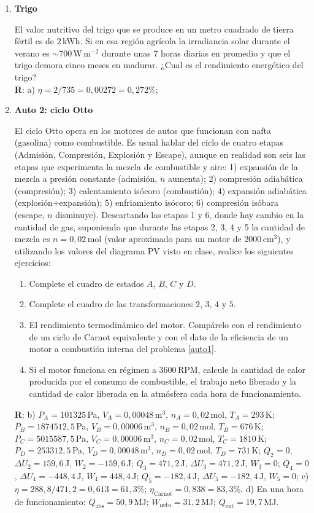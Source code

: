 \documentclass[a4paper,12pt]{article}
\begin{document}
\begin{enumerate}
	\item {\bf{Trigo}}
		
		El valor nutritivo del trigo que se produce en un metro cuadrado de
		tierra fértil es de $2$\,kWh. Si en esa región agrícola la irradiancia solar
		durante el verano es $\sim 700$\,W\,m$^{-2}$ durante unas 7 horas
		diarias en promedio y que el trigo demora cinco meses en madurar.  
		¿Cual es el rendimiento energético del trigo? 
		\\{\bf{R}}: a) $\eta=2/735=0,00272 = 0,272\%$;

	\item {\bf{Auto 2: ciclo Otto}}
		
		El ciclo Otto opera en los motores de autos que funcionan con nafta
		(gasolina) como combustible. Es usual hablar del ciclo de cuatro etapas
		(Admisión, Compresión, Explosión y Escape), aunque en realidad son seis
		las etapas que experimenta la mezcla de combustible y aire: 1)
		expansión de la mezcla a presión constante (admisión, $n$ aumenta); 2)
		compresión adiabática (compresión); 3) calentamiento isócoro
		(combustión); 4) expansión adiabática (explosión+expansión); 5)
		enfriamiento isócoro; 6) compresión isóbara (escape, $n$ disminuye).
		Descartando las etapas 1 y 6, donde hay cambio en la cantidad de gas,
		suponiendo que durante las etapas 2, 3, 4 y 5 la cantidad de mezcla es
		$n=0,02$\,mol (valor aproximado para un motor de $2000$\,cm$^3$), y
		utilizando los valores del diagrama PV visto en clase, realice los
		siguientes ejercicios:
		\begin{enumerate}
			\item Complete el cuadro de estados $A$, $B$, $C$ y $D$. 
			\item Complete el cuadro de las transformaciones $2$, $3$, $4$ y
				$5$.  
			\item El rendimiento termodinámico del motor. Compárelo con el
				rendimiento de un ciclo de Carnot equivalente y con el dato de
				la eficiencia de un motor a combustión interna del problema
				\ref{auto1}.
			\item Si el motor funciona en régimen a $3600$\,RPM, calcule la
				cantidad de calor producida por el consumo de combustible, el
				trabajo neto liberado y la cantidad de calor liberada en la
				atmósfera cada hora de funcionamiento.		
		\end{enumerate}
		{\bf{R}}: 
		b)
		$P_A=101325$\,Pa, $V_A=0,00048$\,m$^3$, $n_A=0,02$\,mol, $T_A=293$\,K; 
		$P_B=1874512,5$\,Pa, $V_B=0,00006$\,m$^3$, $n_B=0,02$\,mol, $T_B=676$\,K; 
		$P_C=5015587,5$\,Pa, $V_C=0,00006$\,m$^3$, $n_C=0,02$\,mol, $T_C=1810$\,K; 
		$P_D=253312,5$\,Pa, $V_D=0,00048$\,m$^3$, $n_D=0,02$\,mol, $T_D=731$\,K;
		$Q_2=0$, $\Delta U_2=159,6$\,J, $W_2=-159,6$\,J;
		$Q_3=471,2$\,J, $\Delta U_3=471,2$\,J, $W_3=0$;
		$Q_4=0$, $\Delta U_4=-448,4$\,J, $W_4=448,4$\,J;
		$Q_5=-182,4$\,J, $\Delta U_5=-182,4$\,J, $W_5=0$;
		c)
		$\eta=288,8/471,2 = 0,613 = 61,3\%$; $\eta_{\mathrm{Carnot}} = 0,838 = 83,3\%$.
		d) En una hora de funcionamiento: $Q_{\mathrm{abs}}=50,9$\,MJ;
		$W_{\mathrm{neto}}=31,2$\,MJ; $Q_{\mathrm{ent}}=19,7$\,MJ.


\end{enumerate}
\end{document}
